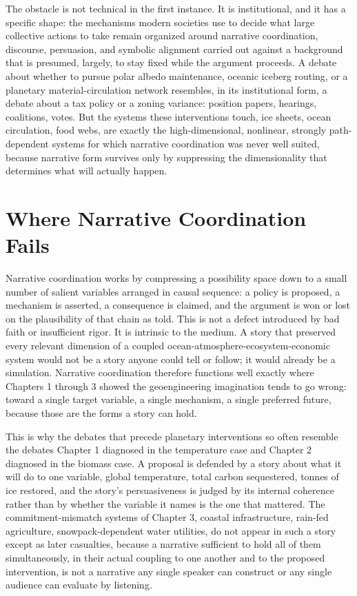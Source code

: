 \documentclass[11pt,oneside]{book}
\begin{document}
The obstacle is not technical in the first instance. It is institutional, and it has a specific shape: the mechanisms modern societies use to decide what large collective actions to take remain organized around narrative coordination, discourse, persuasion, and symbolic alignment carried out against a background that is presumed, largely, to stay fixed while the argument proceeds. A debate about whether to pursue polar albedo maintenance, oceanic iceberg routing, or a planetary material-circulation network resembles, in its institutional form, a debate about a tax policy or a zoning variance: position papers, hearings, coalitions, votes. But the systems these interventions touch, ice sheets, ocean circulation, food webs, are exactly the high-dimensional, nonlinear, strongly path-dependent systems for which narrative coordination was never well suited, because narrative form survives only by suppressing the dimensionality that determines what will actually happen.

\section*{Where Narrative Coordination Fails}

Narrative coordination works by compressing a possibility space down to a small number of salient variables arranged in causal sequence: a policy is proposed, a mechanism is asserted, a consequence is claimed, and the argument is won or lost on the plausibility of that chain as told. This is not a defect introduced by bad faith or insufficient rigor. It is intrinsic to the medium. A story that preserved every relevant dimension of a coupled ocean-atmosphere-ecosystem-economic system would not be a story anyone could tell or follow; it would already be a simulation. Narrative coordination therefore functions well exactly where Chapters 1 through 3 showed the geoengineering imagination tends to go wrong: toward a single target variable, a single mechanism, a single preferred future, because those are the forms a story can hold.

This is why the debates that precede planetary interventions so often resemble the debates Chapter 1 diagnosed in the temperature case and Chapter 2 diagnosed in the biomass case. A proposal is defended by a story about what it will do to one variable, global temperature, total carbon sequestered, tonnes of ice restored, and the story's persuasiveness is judged by its internal coherence rather than by whether the variable it names is the one that mattered. The commitment-mismatch systems of Chapter 3, coastal infrastructure, rain-fed agriculture, snowpack-dependent water utilities, do not appear in such a story except as later casualties, because a narrative sufficient to hold all of them simultaneously, in their actual coupling to one another and to the proposed intervention, is not a narrative any single speaker can construct or any single audience can evaluate by listening.
\end{document}
